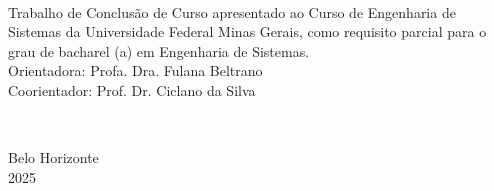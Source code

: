 
\newpage
\thispagestyle{empty}
\begin{center}
    \theauthor\\
    \vspace{5cm}
    \textbf{\MakeUppercase\thetitle} %
\end{center}
\vspace{5cm}
\hfill
\begin{minipage}{8cm}
    Trabalho de Conclusão de Curso apresentado ao Curso de Engenharia de Sistemas da Universidade Federal Minas Gerais, como requisito parcial para o grau de bacharel (a) em Engenharia de Sistemas.\\[3mm]
    Orientadora: Profa. Dra. Fulana Beltrano \\[3mm] %
    Coorientador: Prof. Dr. Ciclano da Silva %
\end{minipage}\\
\begin{center}
    \vspace*{\fill}
    Belo Horizonte\\2025
\end{center}